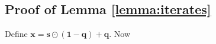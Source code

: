 \documentclass[preprint,3p,12pt]{elsarticle}
\theoremstyle{definition}
\begin{document}
\subsection{Proof of Lemma \ref{lemma:iterates}}\label{iterates}
  Define $\boldsymbol{x} = \boldsymbol{s} \odot (\boldsymbol{1} - \boldsymbol{q}) + \boldsymbol{q}$.
  Now
\end{document}
